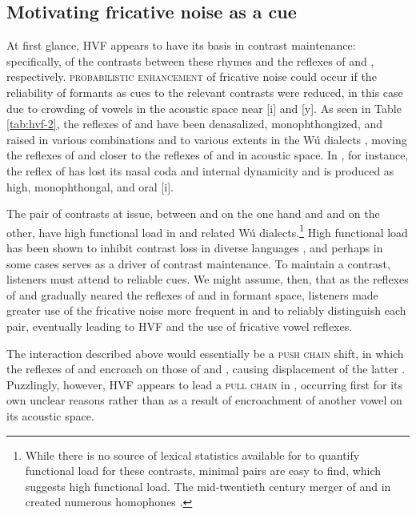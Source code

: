 \documentclass[output=paper,hidelinks]{langscibook}
\begin{document}
\subsection{Motivating fricative noise as a cue}

At first glance, HVF appears to have its basis in contrast maintenance: specifically, of the contrasts between these rhymes and the reflexes of \prien{} and \pryen{}, respectively.
%
\textsc{probabilistic enhancement} \citep{kirby} of fricative noise could occur if the reliability of formants as cues to the relevant contrasts were reduced, in this case due to crowding of vowels in the acoustic space near [i] and [y].
%
As seen in Table \ref{tab:hvf-2}, the reflexes of  \prien{} and \pryen{} have been denasalized, monophthongized, and raised in various combinations and to various extents in the Wú dialects \citep[15]{qian}, moving the reflexes of \prien{} and \pryen{} closer to the reflexes of \pri{} and \pry{} in acoustic space. In \SC{}, for instance, the reflex of  \prien{} has lost its nasal coda and internal dynamicity and is produced as high, monophthongal, and oral [i].


The pair of contrasts at issue, between  \pri{} and \prien{} on the one hand and \pry{} and \pryen{} on the other, have high functional load in \SC{} and related Wú dialects.\footnote{While
    there is no source of lexical statistics available for \THW{} to quantify functional load for these contrasts, minimal pairs are easy to find, which suggests high functional load. The mid-twentieth century merger of \pri{} and \prien{} in  created numerous homophones \citep{qian-change, zhu-grammar}.
    }
%
High functional load has been shown to inhibit contrast loss in diverse languages \citep{wedel-high}, and perhaps in some cases serves as a driver of contrast maintenance.
%
To maintain a contrast, listeners must attend to reliable cues.
%
We might assume, then, that as the reflexes of \prien{} and \pryen{} gradually neared the reflexes of \pri{} and \pry{} in formant space, listeners made greater use of the fricative noise more frequent in \pri{} and \pry{} to reliably distinguish each pair, eventually leading to HVF and the use of fricative vowel reflexes.

The interaction described above would essentially be a \textsc{push chain} shift, in which the reflexes of \prien{} and \pryen{} encroach on those of \pri{} and \pry{}, causing displacement of the latter \citep{ettl07, faytak-qp}.
%
Puzzlingly, however, HVF appears to lead a \textsc{pull chain} in \THW{}, occurring first for its own unclear reasons rather than as a result of encroachment of another vowel on its acoustic space.
\end{document}
